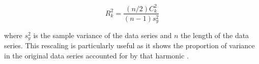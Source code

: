 \begin{equation}
R_k^2 = \frac{(n/2)C_k^2}{(n-1)s_y^2}
\end{equation}

where $s_y^2$ is the sample variance of the data series and $n$ the length of the data series. This rescaling is particularly useful as it shows the proportion of variance in the original data series accounted for by that harmonic \citep{Wilks2011}.